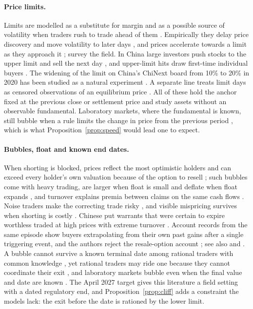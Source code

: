 \documentclass[11pt,a4paper]{article}
\theoremstyle{definition}
\begin{document}
\paragraph{Price limits.} Limits are modelled as a substitute for margin \citep{brennan1986theory} and as a possible source of volatility when traders rush to trade ahead of them \citep{subrahmanyam1994circuit}. Empirically they delay price discovery and move volatility to later days \citep{kim1997price}, and prices accelerate towards a limit as they approach it \citep{cho2003magnet}; \citet{sifat2019circuit,sifat2020survey} survey the field. In China large investors push stocks to the upper limit and sell the next day \citep{chen2019daily}, and upper-limit hits draw first-time individual buyers \citep{seasholes2007predictable}. The widening of the limit on China's ChiNext board from 10\% to 20\% in 2020 has been studied as a natural experiment \citep{wan2022effect,zhang2023price,tang2023price}. A separate line treats limit days as censored observations of an equilibrium price \citep{kodres1993tests,morgan1999limit,wei2002censored}. All of these hold the anchor fixed at the previous close or settlement price and study assets without an observable fundamental. Laboratory markets, where the fundamental is known, still bubble when a rule limits the change in price from the previous period \citep{king1993robustness}, which is what Proposition~\ref{prop:speed} would lead one to expect.

\paragraph{Bubbles, float and known end dates.} When shorting is blocked, prices reflect the most optimistic holders \citep{miller1977risk} and can exceed every holder's own valuation because of the option to resell \citep{harrison1978speculative,scheinkman2003overconfidence}; such bubbles come with heavy trading, are larger when float is small and deflate when float expands \citep{hong2006asset}, and turnover explains premia between claims on the same cash flows \citep{mei2009speculative}. Noise traders make the correcting trade risky \citep{delong1990noise}, and visible mispricing survives when shorting is costly \citep{lamont2003can}. Chinese put warrants that were certain to expire worthless traded at high prices with extreme turnover \citep{xiong2011chinese}. Account records from the same episode show buyers extrapolating from their own past gains after a single triggering event, and the authors reject the resale-option account \citep{pearson2021chinese}; see also \citet{li2021winners} and \citet{barberis2018extrapolation}. A bubble cannot survive a known terminal date among rational traders with common knowledge \citep{tirole1982possibility}, yet rational traders may ride one because they cannot coordinate their exit \citep{abreu2003bubbles}, and laboratory markets bubble even when the final value and date are known \citep{smith1988bubbles}. The April 2027 target gives this literature a field setting with a dated regulatory end, and Proposition~\ref{prop:cliff} adds a constraint the models lack: the exit before the date is rationed by the lower limit.
\end{document}
